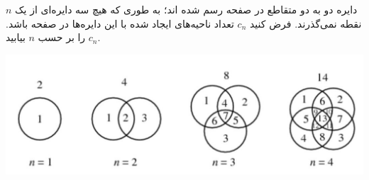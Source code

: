\EXERCISE
$n$
 دایره دو به دو متقاطع در صفحه رسم شده اند؛ به طوری که هیچ سه دایره‌ای از یک نقطه نمی‌گذرند. فرض کنید 
$c_n$
 تعداد ناحیه‌های ایجاد شده با این دایره‌ها در صفحه باشد. 
$c_n$ 
 را بر حسب 
$n$
  بیابید.
  
    \begin{center}
     	\includegraphics[scale=0.3]{./4.png}
    \end{center}